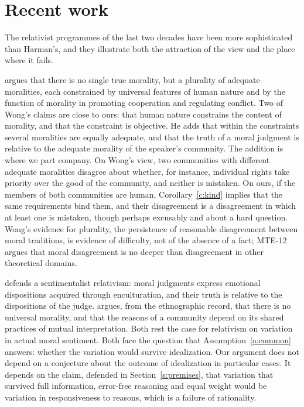 \documentclass{situationist-preprint}
\begin{document}
\section{Recent work}\label{s:recent}

The relativist programmes of the last two decades have been more sophisticated than Harman's, and they illustrate both the attraction of the view and the place where it fails.

\citet{Wong2006} argues that there is no single true morality, but a plurality of adequate moralities, each constrained by universal features of human nature and by the function of morality in promoting cooperation and regulating conflict. Two of Wong's claims are close to ours: that human nature constrains the content of morality, and that the constraint is objective. He adds that within the constraints several moralities are equally adequate, and that the truth of a moral judgment is relative to the adequate morality of the speaker's community. The addition is where we part company. On Wong's view, two communities with different adequate moralities disagree about whether, for instance, individual rights take priority over the good of the community, and neither is mistaken. On ours, if the members of both communities are human, Corollary~\ref{c:kind} implies that the same requirements bind them, and their disagreement is a disagreement in which at least one is mistaken, though perhaps excusably and about a hard question. Wong's evidence for plurality, the persistence of reasonable disagreement between moral traditions, is evidence of difficulty, not of the absence of a fact; MTE-12 argues that moral disagreement is no deeper than disagreement in other theoretical domains.

\citet{Prinz2007} defends a sentimentalist relativism: moral judgments express emotional dispositions acquired through enculturation, and their truth is relative to the dispositions of the judge. \citet{Velleman2013} argues, from the ethnographic record, that there is no universal morality, and that the reasons of a community depend on its shared practices of mutual interpretation. Both rest the case for relativism on variation in actual moral sentiment. Both face the question that Assumption~\ref{a:common} answers: whether the variation would survive idealization. Our argument does not depend on a conjecture about the outcome of idealization in particular cases. It depends on the claim, defended in Section~\ref{s:premises}, that variation that survived full information, error-free reasoning and equal weight would be variation in responsiveness to reasons, which is a failure of rationality.
\end{document}
